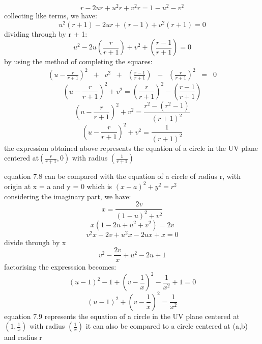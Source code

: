 \begin{equation*}
r - 2ur + u^2r + v^2r = 1 - u^2 - v^2
\end{equation*}
collecting like terms, we have:
\begin{equation*}
u^2(r + 1) -2ur + (r - 1) + v^2(r + 1) = 0
\end{equation*}
dividing through by r + 1:
\begin{equation}
u^2 - 2u(\frac{r}{r + 1}) + v^2 +(\frac{r - 1}{r + 1}) = 0
\end{equation}
by using the method of completing the squares:\\
\begin{align*}
(u - \frac{r}{r+1})^2\;\;+\;\;v^2\;\;+\;\;(\frac{r-1}{r+1})\;\; - \;\;(\frac{r}{r+1})^2\;\; = \;\;0
\end{align*}
\begin{equation*}
(u - \frac{r}{r + 1})^2 + v^2 =(\frac{r}{r + 1})^2 -(\frac{r - 1}{r + 1}) 
\end{equation*}
\begin{equation*}
(u - \frac{r}{r + 1})^2+ v^2 =\frac{r^2 -(r^2 -1)}{(r + 1)^2}
\end{equation*}
\begin{equation}
(u - \frac{r}{r + 1})^2+ v^2 = \frac{1}{(r + 1)^2}
\end{equation}
the expression obtained above represents the equation of a circle in the UV plane centered at$ (\frac{r}{r + 1}, 0) $ with radius $ (\frac{1}{r + 1}) $

equation 7.8 can be compared  with  the equation of a circle of radius r, with origin at x = a and y = 0 which is $ (x - a)^2 + y^2 = r^2 $\\ 
considering the imaginary part, we have:
\begin{equation*}
x =\frac{2v}{(1 - u)^2 + v^2}
\end{equation*}
\begin{equation*}
x(1 - 2u + u^2 + v^2) = 2v
\end{equation*}
\begin{equation*}
v^2x - 2v + u^2x - 2ux + x = 0
\end{equation*}
divide through by x
\begin{equation*}
v^2 - \frac{2v}{x} +u^2 - 2u + 1
\end{equation*}
factorising the expresssion becomes:
\begin{equation*}
(u - 1)^2 -1 + (v - \frac{1}{x})^2 -\frac{1}{x^2} + 1 = 0
\end{equation*}
\begin{equation}
(u - 1)^2 + (v - \frac{1}{x})^2 = \frac{1}{x^2}
\end{equation}
equation 7.9 represents the equation of a circle in the UV plane centered at$ (1,\frac{1}{x}) $ with radius $ (\frac{1}{x}) $
it can also be compared to a circle centered at (a,b) and radius r

